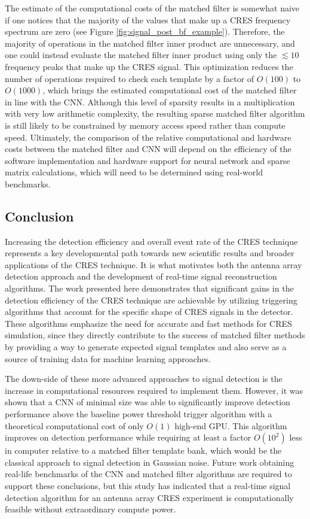 The estimate of the computational costs of the matched filter is somewhat naive if one notices that the majority of the values that make up a CRES frequency spectrum are zero (see Figure \ref{fig:signal_post_bf_example}). Therefore, the majority of operations in the matched filter inner product are unnecessary, and one could instead evaluate the matched filter inner product using only the $\lesssim10$ frequency peaks that make up the CRES signal. This optimization reduces the number of operations required to check each template by a factor of $O(100)$ to $O(1000)$, which brings the estimated computational cost of the matched filter in line with the CNN. Although this level of sparsity results in a multiplication with very low arithmetic complexity, the resulting sparse matched filter algorithm is still likely to be constrained by memory access speed rather than compute speed. Ultimately, the comparison of the relative computational and hardware costs between the matched filter and CNN will depend on the efficiency of the software implementation and hardware support for neural network and sparse matrix calculations, which will need to be determined using real-world benchmarks.

\subsection{Conclusion}
\label{sec:conclusion}

Increasing the detection efficiency and overall event rate of the CRES technique represents a key developmental path towards new scientific results and broader applications of the CRES technique. It is what motivates both the antenna array detection approach and the development of real-time signal reconstruction algorithms. The work presented here demonstrates that significant gains in the detection efficiency of the CRES technique are achievable by utilizing triggering algorithms that account for the specific shape of CRES signals in the detector. These algorithms emphasize the need for accurate and fast methods for CRES simulation, since they directly contribute to the success of matched filter methods by providing a way to generate expected signal templates and also serve as a source of training data for machine learning approaches. 

The down-side of these more advanced approaches to signal detection is the increase in computational resources required to implement them. However, it was shown that a CNN of minimal size was able to significantly improve detection performance above the baseline power threshold trigger algorithm with a theoretical computational cost of only $O(1)$ high-end GPU. This algorithm improves on detection performance while requiring at least a factor $O(10^2)$ less in computer relative to a matched filter template bank, which would be the classical approach to signal detection in Gaussian noise. Future work obtaining real-life benchmarks of the CNN and matched filter algorithms are required to support these conclusions, but this study has indicated that a real-time signal detection algorithm for an antenna array CRES experiment is computationally feasible without extraordinary compute power.

